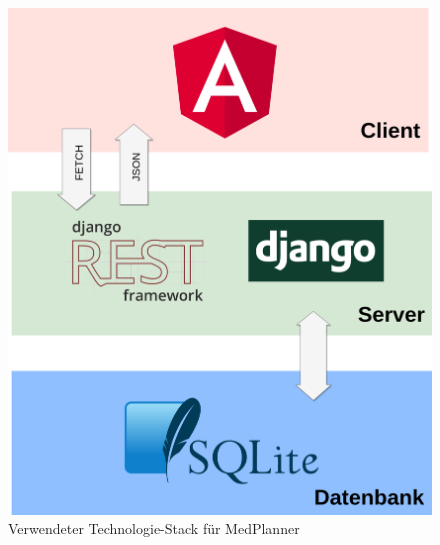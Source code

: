 \documentclass[conference]{IEEEtran}
\begin{document}
\begin{figure}[!h]
	\centering
	\includegraphics[width=0.7\columnwidth]{./figures/medplanner_stack}
	\caption{Verwendeter Technologie-Stack für MedPlanner}
\end{figure}

\end{document}
